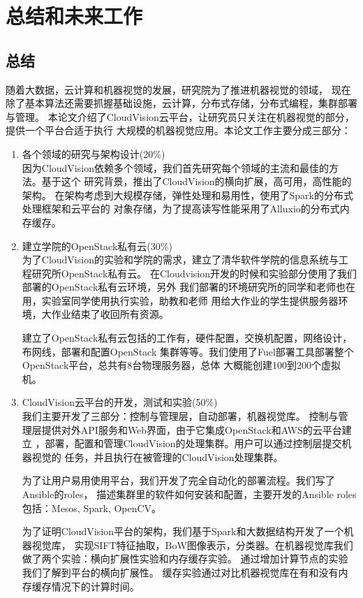 \chapter{总结和未来工作}

\section{总结}
随着大数据，云计算和机器视觉的发展，研究院为了推进机器视觉的领域，
现在除了基本算法还需要抓握基础设施，云计算，分布式存储，分布式编程，集群部署与管理。
本论文介绍了CloudVision云平台，让研究员只关注在机器视觉的部分，提供一个平台合适于执行
大规模的机器视觉应用。本论文工作主要分成三部分：
\begin{enumerate}
  \item 各个领域的研究与架构设计(20\%) \\
        因为CloudVision依赖多个领域，我们首先研究每个领域的主流和最佳的方法。基于这个
        研究背景，推出了CloudVision的横向扩展，高可用，高性能的架构。
        在架构考虑到大规模存储，弹性处理和易用性，使用了Spark的分布式处理框架和云平台的
        对象存储，为了提高读写性能采用了Alluxio的分布式内存缓存。
  \item 建立学院的OpenStack私有云(30\%) \\
        为了CloudVision的实验和学院的需求，建立了清华软件学院的信息系统与工程研究所OpenStack私有云。
        在Cloudvision开发的时候和实验部分使用了我们部署的OpenStack私有云环境，另外
        我们部署的环境研究所的同学和老师也在用，实验室同学使用执行实验，助教和老师
        用给大作业的学生提供服务器环境，大作业结束了收回所有资源。
        
        建立了OpenStack私有云包括的工作有，硬件配置，交换机配置，网络设计，布网线，部署和配置OpenStack
        集群等等。我们使用了Fuel部署工具部署整个OpenStack平台，总共有8台物理服务器，总体
        大概能创建100到200个虚拟机。
  \item CloudVision云平台的开发，测试和实验(50\%) \\
        我们主要开发了三部分：控制与管理层，自动部署，机器视觉库。
        控制与管理层提供对外API服务和Web界面，由于它集成OpenStack和AWS的云平台建立
        ，部署，配置和管理CloudVision的处理集群。用户可以通过控制层提交机器视觉的
        任务，并且执行在被管理的CloudVision处理集群。

        为了让用户易用使用平台，我们开发了完全自动化的部署流程。我们写了Ansible的roles，
        描述集群里的软件如何安装和配置，主要开发的Ansible roles包括：Mesos, Spark, OpenCV。

        为了证明CloudVision平台的架构，我们基于Spark和大数据结构开发了一个机器视觉库，
        实现SIFT特征抽取，BoW图像表示，分类器。在机器视觉库我们做了两个实验：横向扩展性实验和内存缓存实验。
        通过增加计算节点的实验我们了解到平台的横向扩展性。
        缓存实验通过对比机器视觉库在有和没有内存缓存情况下的计算时间。

\end{enumerate}

